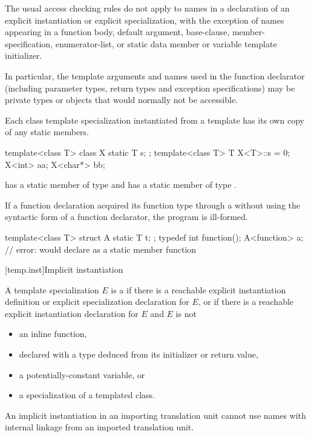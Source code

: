 \pnum
The usual access checking rules do not apply to names
in a declaration of an explicit instantiation or explicit specialization,
with the exception of names appearing in a function body,
default argument, base-clause, member-specification, enumerator-list,
or static data member or variable template initializer.
\begin{note}
In particular, the template arguments and names
used in the function declarator
(including parameter types, return types and exception specifications)
may be private types or objects that would normally not be accessible.
\end{note}

\pnum
Each class template specialization instantiated from a template has its own
copy of any static members.
\begin{example}
\begin{codeblock}
template<class T> class X {
  static T s;
};
template<class T> T X<T>::s = 0;
X<int> aa;
X<char*> bb;
\end{codeblock}

has a static member
of type
and
has a static member
of type
.
\end{example}

\pnum
If a function declaration acquired its function type through
a  without using the syntactic form of
a function declarator, the program is ill-formed.
\begin{example}
\begin{codeblock}
template<class T> struct A {
  static T t;
};
typedef int function();
A<function> a;      // error: would declare  as a static member function
\end{codeblock}
\end{example}

[temp.inst]{Implicit instantiation}

\pnum
A template specialization $E$ is a 
if there is a reachable
explicit instantiation definition or
explicit specialization declaration
for $E$, or
if there is a reachable explicit instantiation declaration for $E$ and
$E$ is not
\begin{itemize}
\item
an inline function,
\item
declared with a type deduced
from its initializer or return value,
\item
a potentially-constant variable, or
\item
a specialization of a templated class.
\end{itemize}
\begin{note}
An implicit instantiation in an importing translation unit
cannot use names with internal linkage
from an imported translation unit.
\end{note}


